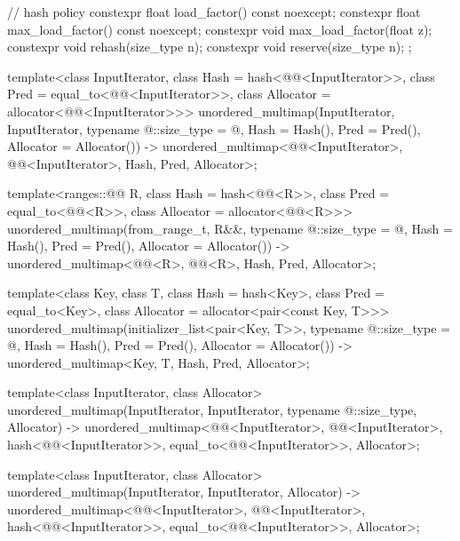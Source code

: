 \begin{codeblock}
{{    // hash policy
    constexpr float load_factor() const noexcept;
    constexpr float max_load_factor() const noexcept;
    constexpr void max_load_factor(float z);
    constexpr void rehash(size_type n);
    constexpr void reserve(size_type n);
  };

  template<class InputIterator,
           class Hash = hash<@@<InputIterator>>,
           class Pred = equal_to<@@<InputIterator>>,
           class Allocator = allocator<@@<InputIterator>>>
    unordered_multimap(InputIterator, InputIterator,
                       typename @\seebelow@::size_type = @\seebelow@,
                       Hash = Hash(), Pred = Pred(), Allocator = Allocator())
      -> unordered_multimap<@@<InputIterator>, @@<InputIterator>,
                            Hash, Pred, Allocator>;

  template<ranges::@@ R,
           class Hash = hash<@@<R>>,
           class Pred = equal_to<@@<R>>,
           class Allocator = allocator<@@<R>>>
    unordered_multimap(from_range_t, R&&, typename @\seebelow@::size_type = @\seebelow@,
                       Hash = Hash(), Pred = Pred(), Allocator = Allocator())
      -> unordered_multimap<@@<R>, @@<R>, Hash, Pred, Allocator>;

  template<class Key, class T, class Hash = hash<Key>,
           class Pred = equal_to<Key>, class Allocator = allocator<pair<const Key, T>>>
    unordered_multimap(initializer_list<pair<Key, T>>,
                       typename @\seebelow@::size_type = @\seebelow@,
                       Hash = Hash(), Pred = Pred(), Allocator = Allocator())
      -> unordered_multimap<Key, T, Hash, Pred, Allocator>;

  template<class InputIterator, class Allocator>
    unordered_multimap(InputIterator, InputIterator, typename @\seebelow@::size_type, Allocator)
      -> unordered_multimap<@@<InputIterator>, @@<InputIterator>,
                            hash<@@<InputIterator>>,
                            equal_to<@@<InputIterator>>, Allocator>;

  template<class InputIterator, class Allocator>
    unordered_multimap(InputIterator, InputIterator, Allocator)
      -> unordered_multimap<@@<InputIterator>, @@<InputIterator>,
                            hash<@@<InputIterator>>,
                            equal_to<@@<InputIterator>>, Allocator>;

}
\end{codeblock}
